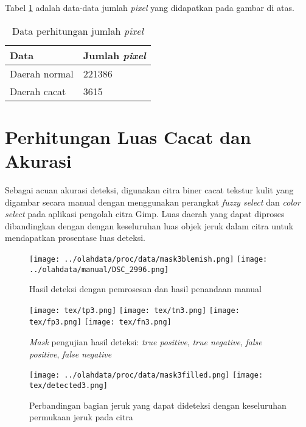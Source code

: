 \documentclass[laporan.tex]{subfiles}
\begin{document}

Tabel \ref{table:pixelcountexample} adalah data-data jumlah \emph{pixel} yang didapatkan pada gambar di atas.

\begin{table}[h!]
\centering
\begin{tabular}{|l|l|}
\hline
Data & Jumlah \emph{pixel} \\
\hline
Daerah normal & 221386 \\
Daerah cacat & 3615 \\
\hline
\end{tabular}
\caption{Data perhitungan jumlah \emph{pixel}}
\label{table:pixelcountexample}
\end{table}

\section{Perhitungan Luas Cacat dan Akurasi}

Sebagai acuan akurasi deteksi, digunakan citra biner cacat tekstur kulit yang digambar secara manual dengan menggunakan perangkat \emph{fuzzy select} dan \emph{color select} pada aplikasi pengolah citra Gimp. Luas daerah yang dapat diproses dibandingkan dengan dengan keseluruhan luas objek jeruk dalam citra untuk mendapatkan prosentase luas deteksi.

\begin{figure}[h!]
\centering
\texttt{[image: ../olahdata/proc/data/mask3blemish.png]}
\texttt{[image: ../olahdata/manual/DSC\_2996.png]} \qquad
\caption{Hasil deteksi dengan pemrosesan dan hasil penandaan manual}
\end{figure}

\begin{figure}[h!]
\centering
\texttt{[image: tex/tp3.png]} \hskip 0.5cm
\texttt{[image: tex/tn3.png]} \hskip 0.5cm
\texttt{[image: tex/fp3.png]} \hskip 0.5cm
\texttt{[image: tex/fn3.png]}
\caption{\emph{Mask} pengujian hasil deteksi: \emph{true positive}, \emph{true negative}, \emph{false positive}, \emph{false negative}}
\end{figure}

\begin{figure}[h!]
\centering
\texttt{[image: ../olahdata/proc/data/mask3filled.png]} \qquad
\texttt{[image: tex/detected3.png]}
\caption{Perbandingan bagian jeruk yang dapat dideteksi dengan keseluruhan permukaan jeruk pada citra}
\end{figure}
\end{document}
